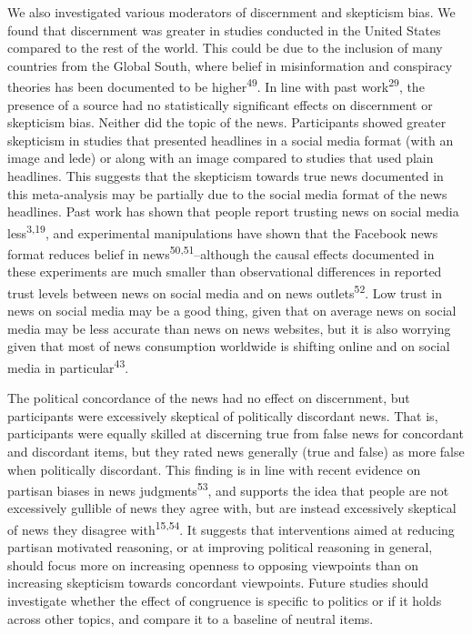 \documentclass[
  doc,floatsintext]{apa6}
\begin{document}
We also investigated various moderators of discernment and skepticism bias. We found that discernment was greater in studies conducted in the United States compared to the rest of the world. This could be due to the inclusion of many countries from the Global South, where belief in misinformation and conspiracy theories has been documented to be higher\textsuperscript{49}. In line with past work\textsuperscript{29}, the presence of a source had no statistically significant effects on discernment or skepticism bias. Neither did the topic of the news. Participants showed greater skepticism in studies that presented headlines in a social media format (with an image and lede) or along with an image compared to studies that used plain headlines. This suggests that the skepticism towards true news documented in this meta-analysis may be partially due to the social media format of the news headlines. Past work has shown that people report trusting news on social media less\textsuperscript{3,19}, and experimental manipulations have shown that the Facebook news format reduces belief in news\textsuperscript{50,51}--although the causal effects documented in these experiments are much smaller than observational differences in reported trust levels between news on social media and on news outlets\textsuperscript{52}. Low trust in news on social media may be a good thing, given that on average news on social media may be less accurate than news on news websites, but it is also worrying given that most of news consumption worldwide is shifting online and on social media in particular\textsuperscript{43}.

The political concordance of the news had no effect on discernment, but participants were excessively skeptical of politically discordant news. That is, participants were equally skilled at discerning true from false news for concordant and discordant items, but they rated news generally (true and false) as more false when politically discordant. This finding is in line with recent evidence on partisan biases in news judgments\textsuperscript{53}, and supports the idea that people are not excessively gullible of news they agree with, but are instead excessively skeptical of news they disagree with\textsuperscript{15,54}. It suggests that interventions aimed at reducing partisan motivated reasoning, or at improving political reasoning in general, should focus more on increasing openness to opposing viewpoints than on increasing skepticism towards concordant viewpoints. Future studies should investigate whether the effect of congruence is specific to politics or if it holds across other topics, and compare it to a baseline of neutral items.
\end{document}
